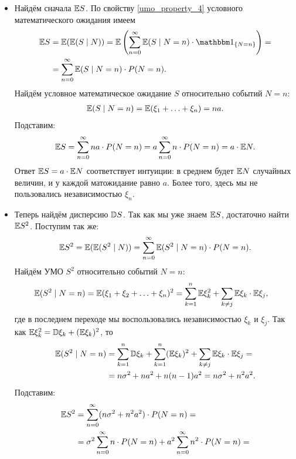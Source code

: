 \documentclass[../main.tex]{subfiles}
\begin{document}
\begin{exmpl}
 \begin{itemize}
  \item Найдём сначала $ \mathbb E S $. По свойству \ref{umo_property_4} условного математического ожидания имеем
   \begin{align*}
    \E S &= \E(\E(S \mid N)) = \E \left( \sum_{n=0}^{\infty} \E(S \mid N = n) \cdot \Ind_{\left\{ N = n \right\}} \right) = \\
    &= \sum_{n=0}^{\infty} \E(S \mid N = n) \cdot P(N = n).
   \end{align*} Найдём условное математическое ожидание $ S $ относительно событий $ N = n $:
   \begin{align*}
    \mathbb E(S \mid N = n) = \mathbb E(\xi_1 + \ldots + \xi_n) = na.
   \end{align*} Подставим:
   \begin{align*}
    \mathbb E S = \sum_{n=0}^{\infty}na \cdot P(N = n) = a \sum_{n=0}^{\infty} n \cdot P(N = n) = a \cdot \mathbb E N.
   \end{align*} Ответ $ \mathbb E S = a\cdot \mathbb E N$ соответствует интуиции: в среднем будет $ \mathbb E N $ случайных величин, и у каждой матожидание равно $ a $. Более того, здесь мы не пользовались независимостью $ \xi_n $.
  \item Теперь найдём дисперсию $ \mathbb D S $. Так как мы уже знаем $ \mathbb E S $, достаточно найти $ \mathbb E S^{2} $. Поступим так же:
   \begin{align*}
    \mathbb E S^{2} = \mathbb E(\mathbb E(S^{2}\mid N)) = \sum_{n=0}^{\infty} \mathbb E(S^{2} \mid N = n) \cdot P(N = n).
   \end{align*} Найдём УМО $ S^{2} $ относительно событий $ N = n $:
   \begin{align*}
    \mathbb E(S^{2} \mid N = n) &= \mathbb E(\xi_1 + \xi_2 + \ldots + \xi_n)^{2} = \sum_{k=1}^{n} \mathbb E \xi_k^{2} + \sum_{k \neq j} \mathbb E\xi_k \cdot \mathbb E\xi_j,
   \end{align*} где в последнем переходе мы воспользовались независимостью $ \xi_k $ и $ \xi_j $. Так как $ \mathbb E\xi_k^{2} = \mathbb D\xi_k + (\mathbb E\xi_k)^{2} $, то
   \begin{align*}
    \mathbb E (S^{2} \mid N = n) &= \sum_{k=1}^{n} \mathbb D\xi_k + \sum_{k=1}^{n} (\mathbb E\xi_k)^{2} + \sum_{k \neq j} \mathbb E\xi_k \cdot \mathbb E\xi_j = \\
    &= n\sigma^{2} + na^{2} + n(n-1)a^{2} = n\sigma^{2} + n^{2}a^{2}.
   \end{align*} Подставим:
   \begin{align*}
    \E S^{2} &= \sum_{n=0}^{\infty}(n\sigma^{2} + n^{2}a^{2})\cdot P(N=n) = \\
    &= \sigma^{2} \sum_{n=0}^{\infty} n \cdot P(N=n) + a^{2} \sum_{n=0}^{\infty} n^{2}\cdot P(N=n) = \\

\end{align*}
\end{itemize}
\end{exmpl}
\end{document}
